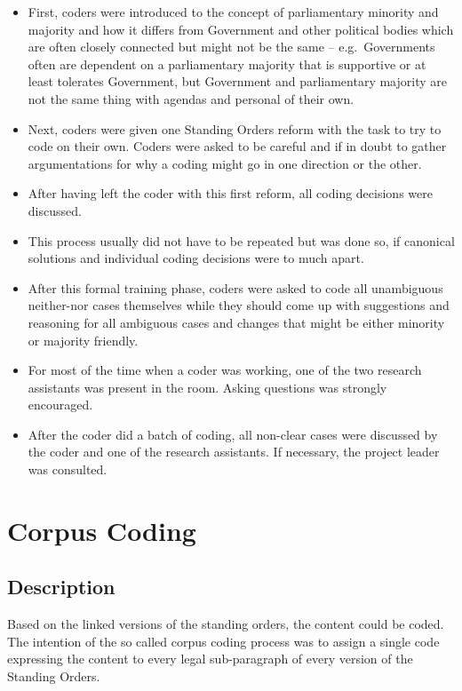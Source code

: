 \documentclass[10pt,]{article}
\providecommand{\tightlist}{%
  \setlength{\itemsep}{0pt}\setlength{\parskip}{0pt}}
\begin{document}
\begin{itemize}
\tightlist
\item
  First, coders were introduced to the concept of parliamentary minority
  and majority and how it differs from Government and other political
  bodies which are often closely connected but might not be the same --
  e.g.~Governments often are dependent on a parliamentary majority that
  is supportive or at least tolerates Government, but Government and
  parliamentary majority are not the same thing with agendas and
  personal of their own.
\item
  Next, coders were given one Standing Orders reform with the task to
  try to code on their own. Coders were asked to be careful and if in
  doubt to gather argumentations for why a coding might go in one
  direction or the other.
\item
  After having left the coder with this first reform, all coding
  decisions were discussed.
\item
  This process usually did not have to be repeated but was done so, if
  canonical solutions and individual coding decisions were to much
  apart.
\item
  After this formal training phase, coders were asked to code all
  unambiguous neither-nor cases themselves while they should come up
  with suggestions and reasoning for all ambiguous cases and changes
  that might be either minority or majority friendly.
\item
  For most of the time when a coder was working, one of the two research
  assistants was present in the room. Asking questions was strongly
  encouraged.
\item
  After the coder did a batch of coding, all non-clear cases were
  discussed by the coder and one of the research assistants. If
  necessary, the project leader was consulted.
\end{itemize}

\newpage

\section{Corpus Coding}\label{corpus-coding}

\subsection{Description}\label{description-2}

Based on the linked versions of the standing orders, the content could
be coded. The intention of the so called corpus coding process was to
assign a single code expressing the content to every legal sub-paragraph
of every version of the Standing Orders.
\end{document}
